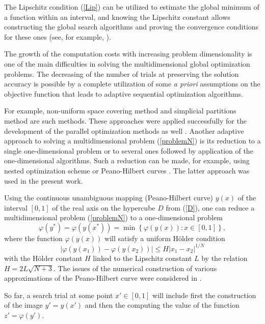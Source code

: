 \documentclass{svproc}
\begin{document}
The Lipschitz condition (\ref{Lip}) can be utilized to estimate the global minimum of a function within an interval, and knowing the Lipschitz constant allows constructing the global search algorithms and proving the convergence conditions for these ones (see, for example, \cite{Strongin2000}).

The growth of the computation costs with increasing problem dimensionality is one of the main difficulties in solving the multidimensional global optimization problems. The decreasing of the number of trials at preserving the solution accuracy is possible by a complete utilization of some {\it a priori} assumptions on the objective function that leads to adaptive sequential optimization algorithms.

For example, non-uniform space covering method \cite{Evtushenko2013} and simplicial partitions method \cite{Zilinskas2010} are such methods. These approaches were applied successfully for the development of the parallel optimization methods as well \cite{Evtushenko2009,Paulavicius2011}. 
Another adaptive approach to solving a multidimensional problem (\ref{problemN}) is its reduction to a single one-dimensional problem or to several ones followed by application of the one-dimensional algorithms. 
Such a reduction can be made, for example, using nested optimization scheme \cite{Grishagin2018} or Peano-Hilbert curves \cite{Barkalov2018}. 
The latter approach was used in the present work.

Using the continuous unambiguous mapping (Peano-Hilbert curve) $y(x)$ of the interval $[0,1]$ of the real axis on the hypercube $D$ from (\ref{D}), one can reduce a multidimensional problem (\ref{problemN}) to a one-dimensional problem
\[
\varphi(y^\ast)=\varphi(y(x^\ast))=\min{\left\{\varphi(y(x)): x\in[0,1]\right\}},
\]
where the function $\varphi(y(x))$ will satisfy a uniform H{\"o}lder condition
\[
\left|\varphi(y(x_1))-\varphi(y(x_2))\right|\leq H\left|x_1-x_2\right|^{1/N}
\]
with the H{\"o}lder constant $H$ linked to the Lipschitz constant $L$ by the relation $ H=2 L \sqrt{N+3}$. 
The issues of the numerical construction of various approximations of the Peano-Hilbert curve were considered in \cite{Strongin2000,Sergeyev2013}.

So far, a search trial at some point $x'\in[0,1]$ will include first the construction of the image $y'=y(x')$ and then the computing the value of the function $z'=\varphi(y')$.

\end{document}
